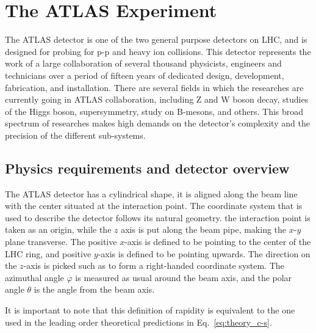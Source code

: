 \chapter{The ATLAS Experiment}
\label{sec:ATLAS}

The ATLAS detector is one of the two general purpose detectors on LHC, and is designed for probing for p-p and heavy ion collisions.
This detector represents the work of a large collaboration of several thousand physicists, engineers and technicians over a period of fifteen years of dedicated design, development, fabrication, and installation. There are several fields in which the researches are currently going in ATLAS collaboration, including Z and W boson decay, studies of the Higgs boson, supersymmetry, study on B-mesons, and others. This broad spectrum of researches makes high demands on the detector's complexity and the precision of the different sub-systems.

\section{Physics requirements and detector overview}
\label{sec:ATLAS_overview}
The ATLAS detector has a cylindrical shape, it is aligned along the beam line with the center situated at the interaction point.
The coordinate system that is used to describe the detector follows its natural geometry. the interaction point is taken as an origin,
while the $z$ axis is put along the beam pipe, making the $x$-$y$ plane transverse. The positive $x$-axis is defined to be pointing to the center
of the LHC ring, and positive $y$-axis is defined to be pointing upwards. The direction on the $z$-axis is picked such as to form a right-handed coordinate system.
The azimuthal angle $\varphi$ is measured as usual around the beam axis, and the polar angle $\theta$ is the angle from the beam axis.

\begin{figure}
\end{figure}
It is important to note that this definition of rapidity is equivalent to the one used in the leading order theoretical predictions in Eq.~\ref{eq:theory_c-s}.


